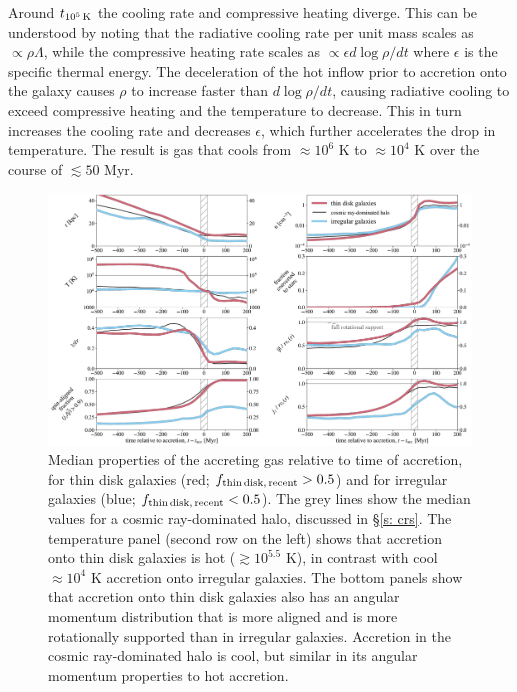 \documentclass[fleqn,usenatbib]{mnras}
\newcommand{\fthin}{f_{\rm thin\,disk,\,recent}}
\newcommand{\tcools}{t_{10^5\,{\rm K}}}
\begin{document}
Around $\tcools$ the cooling rate and compressive heating diverge.
This can be understood by noting that the radiative cooling rate per unit mass scales as $\propto\rho\Lambda$, while the compressive heating rate scales as $\propto\epsilon d\log\rho/d t$ where $\epsilon$ is the specific thermal energy.
The deceleration of the hot inflow prior to accretion onto the galaxy causes $\rho$ to increase faster than $d\log\rho/d t$, causing radiative cooling to exceed compressive heating and the temperature to decrease.
This in turn increases the cooling rate and decreases $\epsilon$, which further accelerates the drop in temperature.
The result is gas that cools from $\approx10^6$ K to $\approx10^4$ K over the course of $\lesssim 50$ Myr.

\begin{figure}
    \centering
    \includegraphics[width=\textwidth]{figures/variations/relative_to_accretion/before_and_after/before_and_after_combined2.pdf}
    \caption{
    Median properties of the accreting gas relative to time of accretion, for thin disk galaxies (red; $\fthin>0.5$) and for irregular galaxies (blue; $\fthin<0.5$).
    The grey lines show the median values for a cosmic ray-dominated halo, discussed in \S\ref{s: crs}.
    The temperature panel (second row on the left) shows that accretion onto thin disk galaxies is hot ($\gtrsim10^{5.5}$ K), in contrast with cool $\approx10^4$ K accretion onto irregular galaxies.
    The bottom panels show that accretion onto thin disk galaxies also has an angular momentum distribution that is more aligned and is more rotationally supported than in irregular galaxies.
    Accretion in the cosmic ray-dominated halo is cool, but similar in its angular momentum properties to hot accretion. 
    }
    \label{f: before and after combined}
\end{figure}
\end{document}
